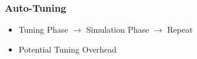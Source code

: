 \documentclass[
	10pt,
	t		%
]{beamer}
\begin{document}
\begin{frame}
	\frametitle{Auto-Tuning }
	
	\begin{itemize}
		\item Tuning Phase $\rightarrow$ Simulation Phase $\rightarrow$ Repeat
		\item Potential Tuning Overhead
	\end{itemize}
	
	\vspace{0.1cm}
	
	\begin{figure}
	\end{figure}
	
	
\end{frame}
\end{document}
